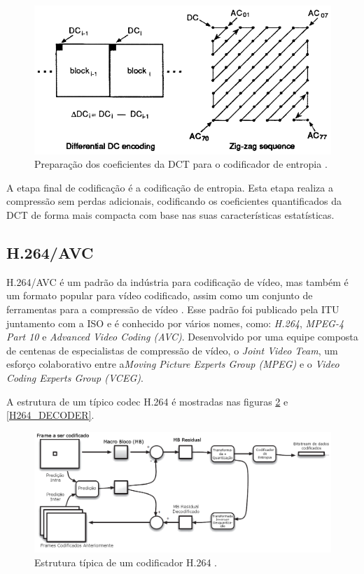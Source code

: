 \begin{figure}[h]
	\centering
	\includegraphics[scale=0.55]{figuras/ZIG-ZAG.png}
	\caption{Preparação dos coeficientes da DCT para o codificador de entropia \cite{wallace1991jpeg}.}
	\label{ZIG_ZAG}
\end{figure}

A etapa final de codificação é a codificação de entropia.  Esta etapa realiza a compressão sem perdas adicionais, codificando os coeficientes quantificados da DCT de forma mais compacta com base nas suas características estatísticas.

\subsection{H.264/AVC}

H.264/AVC é um padrão da indústria para codificação de vídeo, mas também é um formato popular para vídeo codificado, assim como um conjunto de ferramentas para a compressão de vídeo \cite{richardson2011h}. Esse padrão foi publicado pela ITU juntamento com a ISO e é conhecido por vários nomes, como: \textit{H.264}, \textit{MPEG-4 Part 10} e \textit{Advanced Video Coding (AVC)}. Desenvolvido por uma equipe composta de centenas de especialistas de compressão de vídeo, o \textit{Joint Video Team}, um esforço colaborativo entre a\textit{Moving Picture Experts Group (MPEG)} e o \textit{Video Coding Experts Group (VCEG)}.

A estrutura de um típico codec H.264 é mostradas nas figuras \ref{H264_ENCODER} e \ref{H264_DECODER}. \cite{richardson2011h}

\begin{figure}[h]
	\centering
	\includegraphics[scale=0.45]{figuras/H264_CODIFICADOR.png}
	\caption{Estrutura típica de um codificador H.264 \cite{richardson2011h}.}
	\label{H264_ENCODER}
\end{figure}

